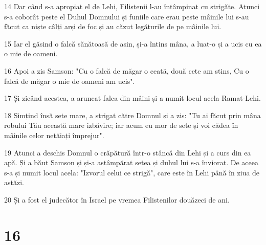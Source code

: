 \par 14 Dar când s-a apropiat el de Lehi, Filistenii l-au întâmpinat cu strigăte. Atunci s-a coborât peste el Duhul Domnului și funiile care erau peste mâinile lui s-au făcut ca niște câlți arși de foc și au căzut legăturile de pe mâinile lui.
\par 15 Iar el găsind o falcă sănătoasă de asin, și-a întins mâna, a luat-o și a ucis cu ea o mie de oameni.
\par 16 Apoi a zis Samson: "Cu o falcă de măgar o ceată, două cete am stins, Cu o falcă de măgar o mie de oameni am ucis".
\par 17 Și zicând acestea, a aruncat falca din mâini și a numit locul acela Ramat-Lehi.
\par 18 Simțind însă sete mare, a strigat către Domnul și a zis: "Tu ai făcut prin mâna robului Tău această mare izbăvire; iar acum eu mor de sete și voi cădea în mâinile celor netăiați împrejur".
\par 19 Atunci a deschis Domnul o crăpătură într-o stâncă din Lehi și a curs din ea apă. Și a băut Samson și și-a astâmpărat setea și duhul lui s-a înviorat. De aceea s-a și numit locul acela: "Izvorul celui ce strigă", care este în Lehi până în ziua de astăzi.
\par 20 Și a fost el judecător în Israel pe vremea Filistenilor douăzeci de ani.

\chapter{16}

